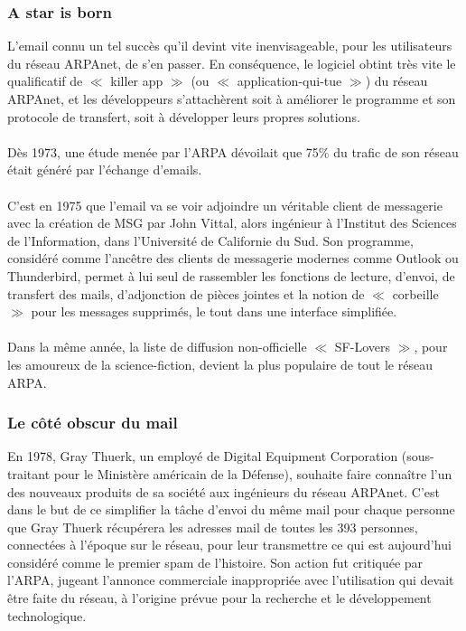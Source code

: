 \documentclass[french]{report}
\begin{document}
\subsubsection{\LARGE A star is born}
\LARGE L’email connu un tel succès qu’il devint vite inenvisageable, pour les utilisateurs du réseau ARPAnet, de s’en passer. En conséquence, le logiciel obtint très vite le qualificatif de $\ll$ killer app $\gg$ (ou $\ll$ application-qui-tue $\gg$) du réseau ARPAnet, et les développeurs s’attachèrent soit à améliorer le programme et son protocole de transfert, soit à développer leurs propres solutions.\\ \\
Dès 1973, une étude menée par l’ARPA dévoilait que 75\% du trafic de son réseau était généré par l’échange d’emails.\\ \\
C’est en 1975 que l’email va se voir adjoindre un véritable client de messagerie avec la création de MSG par John Vittal, alors ingénieur à l’Institut des Sciences de l’Information, dans l’Université de Californie du Sud. Son programme, considéré comme l’ancêtre des clients de messagerie modernes comme Outlook ou Thunderbird, permet à lui seul de rassembler les fonctions de lecture, d’envoi, de transfert des mails, d’adjonction de pièces jointes et la notion de $\ll$ corbeille $\gg$ pour les messages supprimés, le tout dans une interface simplifiée.\\ \\
Dans la même année, la liste de diffusion non-officielle $\ll$ SF-Lovers $\gg$, pour les amoureux de la science-fiction, devient la plus populaire de tout le réseau ARPA.
\subsubsection{\LARGE Le côté obscur du mail}
\LARGE En 1978, Gray Thuerk, un employé de Digital Equipment Corporation (sous-traitant pour le Ministère américain de la Défense), souhaite faire connaître l’un des nouveaux produits de sa société aux ingénieurs du réseau ARPAnet. C’est dans le but de ce simplifier la tâche d’envoi du même mail pour chaque personne que Gray Thuerk récupérera les adresses mail de toutes les 393 personnes, connectées à l’époque sur le réseau, pour leur transmettre ce qui est aujourd’hui considéré comme le premier spam de l’histoire. Son action fut critiquée par l’ARPA, jugeant l’annonce commerciale inappropriée avec l’utilisation qui devait être faite du réseau, à l’origine prévue pour la recherche et le développement technologique.
\end{document}
